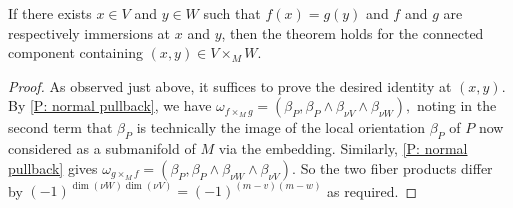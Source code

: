 \begin{lemma}\label{L: im/im}
If there exists $x\in V$ and $y\in W$ such that  $f(x)=g(y)$ and $f$ and $g$ are respectively immersions at $x$ and $y$, then the theorem holds for the connected component containing $(x,y)\in V\times_MW$. 
\end{lemma}
\begin{proof}
As observed just above, it suffices to prove the desired identity at $(x,y)$. By \cref{P: normal pullback}, we have 
$\omega_{f\times_M g}=(\beta_P,\beta_P\wedge \beta_{\nu V}\wedge \beta_{\nu W}),$ noting in the second term that $\beta_P$ is technically the image of the local orientation $\beta_P$ of $P$ now considered as a submanifold of $M$  via the embedding. Similarly,  \cref{P: normal pullback} gives  
$\omega_{g\times_M f}=(\beta_P,\beta_P\wedge \beta_{\nu W}\wedge \beta_{\nu V}).$ So the two fiber products differ by $(-1)^{\dim(\nu W)\dim(\nu V)}=(-1)^{(m-v)(m-w)}$ as required.
\end{proof}

